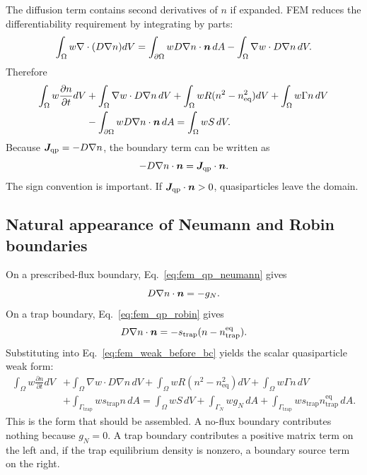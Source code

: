 \documentclass[11pt]{article}
\newcommand{\trap}{\mathrm{trap}}
\newcommand{\eq}{\mathrm{eq}}
\begin{document}
The diffusion term contains second derivatives of $n$ if expanded. FEM reduces the differentiability requirement by integrating by parts:
\begin{equation}
\int_{\Omega}w\nabla\cdot(D\nabla n)dV
=\int_{\partial\Omega}wD\nabla n\cdot\bm{n}\,dA
-\int_{\Omega}\nabla w\cdot D\nabla n\,dV.
\end{equation}
Therefore
\begin{align}
\int_{\Omega}w\frac{\partial n}{\partial t}dV
&+\int_{\Omega}\nabla w\cdot D\nabla n\,dV
+\int_{\Omega}wR(n^2-n_{\eq}^2)dV
+\int_{\Omega}w\Gamma n\,dV \nonumber\\
&-\int_{\partial\Omega}wD\nabla n\cdot\nvec\,dA
=\int_{\Omega}wS\,dV.
\label{eq:fem_weak_before_bc}
\end{align}
Because $\bm{J}_{\mathrm{qp}}=-D\nabla n$, the boundary term can be written as
\begin{equation}
-D\nabla n\cdot\bm{n}=\bm{J}_{\mathrm{qp}}\cdot\bm{n}.
\end{equation}
The sign convention is important. If $\bm{J}_{\mathrm{qp}}\cdot\bm{n}>0$, quasiparticles leave the domain.

\subsection{Natural appearance of Neumann and Robin boundaries}
On a prescribed-flux boundary, Eq.~\eqref{eq:fem_qp_neumann} gives
\begin{equation}
D\nabla n\cdot\bm{n}=-g_N.
\end{equation}
On a trap boundary, Eq.~\eqref{eq:fem_qp_robin} gives
\begin{equation}
D\nabla n\cdot\nvec=-s_{\trap}(n-n_{\trap}^{\eq}).
\end{equation}
Substituting into Eq.~\eqref{eq:fem_weak_before_bc} yields the scalar quasiparticle weak form:
\begin{align}
\int_{\Omega}w\frac{\partial n}{\partial t}dV
&+\int_{\Omega}\nabla w\cdot D\nabla n\,dV
+\int_{\Omega}wR(n^2-n_{\eq}^2)dV
+\int_{\Omega}w\Gamma n\,dV \nonumber\\
&+\int_{\Gamma_{\trap}}w s_{\trap}n\,dA
=\int_{\Omega}wS\,dV
+\int_{\Gamma_N}w g_N\,dA
+\int_{\Gamma_{\trap}}w s_{\trap}n_{\trap}^{\eq}\,dA.
\label{eq:fem_scalar_qp_weak_full}
\end{align}
This is the form that should be assembled. A no-flux boundary contributes nothing because $g_N=0$. A trap boundary contributes a positive matrix term on the left and, if the trap equilibrium density is nonzero, a boundary source term on the right.
\end{document}
